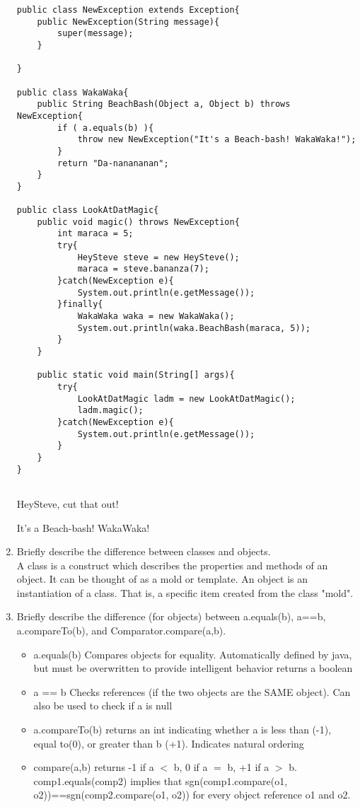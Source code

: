 \documentclass[11pt]{article}
\newenvironment{answer}{\large\lstset{basicstyle=\large}\color{white}}{}
\newenvironment{answer}{\large\lstset{basicstyle=\large}\color{red}}{}
\begin{document}
\begin{enumerate}
\begin{lstlisting}
public class NewException extends Exception{
    public NewException(String message){
        super(message);
    }

}
           
public class WakaWaka{
    public String BeachBash(Object a, Object b) throws NewException{
        if ( a.equals(b) ){
            throw new NewException("It's a Beach-bash! WakaWaka!");
        }
        return "Da-nanananan";
    }
}

public class LookAtDatMagic{
    public void magic() throws NewException{
        int maraca = 5;
        try{
            HeySteve steve = new HeySteve();
            maraca = steve.bananza(7);
        }catch(NewException e){
            System.out.println(e.getMessage());
        }finally{
            WakaWaka waka = new WakaWaka();
            System.out.println(waka.BeachBash(maraca, 5));
        }
    }

    public static void main(String[] args){
        try{
            LookAtDatMagic ladm = new LookAtDatMagic();
            ladm.magic();
        }catch(NewException e){
            System.out.println(e.getMessage());
        }
    }
}


\end{lstlisting}
\begin{answer}
HeySteve, cut that out!


It's a Beach-bash! WakaWaka!
\end{answer}

\item Briefly describe the difference between classes and objects.\\
\begin{answer}
    A class is a construct which describes the properties and methods of an object. It can be thought of as a mold or template. An object is an 
instantiation of a class. That is, a specific item created from the class "mold".
\end{answer}

\item Briefly describe the difference (for objects) between a.equals(b), a==b, a.compareTo(b), and Comparator.compare(a,b).
\begin{answer}
    \begin{itemize}
        \item a.equals(b) Compares objects for equality. Automatically defined by java, but must be overwritten
to provide intelligent behavior returns a boolean
    \item a == b  Checks references (if the two objects are the SAME object). Can also be used to check if a is null  
    \item a.compareTo(b) returns an int indicating whether a is less than (-1), equal to(0), or greater than b (+1). Indicates natural ordering 
    \item compare(a,b) returns -1 if a $<$ b, 0 if a $=$ b, +1 if a $>$ b. comp1.equals(comp2) implies that sgn(comp1.compare(o1, o2))==sgn(comp2.compare(o1, o2)) for every object reference o1 and o2.
    \end{itemize}
\end{answer}


\end{enumerate}
\end{document}

